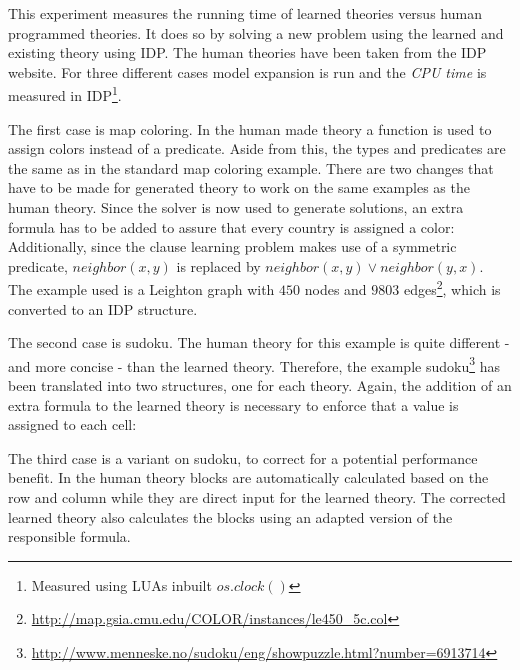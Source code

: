 \begin{experiment}
	This experiment measures the running time of learned theories versus human programmed theories.
	It does so by solving a new problem using the learned and existing theory using IDP.
	The human theories have been taken from the IDP website.
	For three different cases model expansion is run and the \emph{CPU time} is measured in IDP\footnote{Measured using LUAs inbuilt $os.clock()$}.

	The first case is map coloring.
	In the human made theory a function is used to assign colors instead of a predicate.
	Aside from this, the types and predicates are the same as in the standard map coloring example.
	There are two changes that have to be made for generated theory to work on the same examples as the human theory.
	Since the solver is now used to generate solutions, an extra formula has to be added to assure that every country is assigned a color:
	Additionally, since the clause learning problem makes use of a symmetric predicate, $\mathit{neighbor}(x, y)$ is replaced by $\mathit{neighbor}(x, y) \lor \mathit{neighbor(y,x)}$.
	The example used is a Leighton graph with $450$ nodes and $9803$ edges\footnote{\url{http://map.gsia.cmu.edu/COLOR/instances/le450_5c.col}}, which is converted to an IDP structure.

	The second case is sudoku.
	The human theory for this example is quite different - and more concise - than the learned theory.
	Therefore, the example sudoku\footnote{\url{http://www.menneske.no/sudoku/eng/showpuzzle.html?number=6913714}} has been translated into two structures, one for each theory.
	Again, the addition of an extra formula to the learned theory is necessary to enforce that a value is assigned to each cell: 

	The third case is a variant on sudoku, to correct for a potential performance benefit.
	In the human theory blocks are automatically calculated based on the row and column while they are direct input for the learned theory.
	The corrected learned theory also calculates the blocks using an adapted version of the responsible formula.


\end{experiment}
